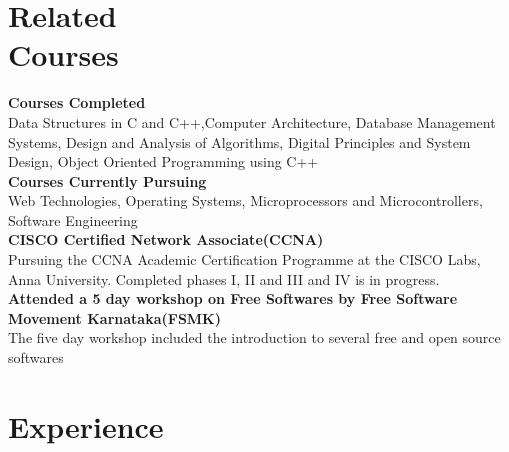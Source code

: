 \documentclass[margin,line]{resume}
\begin{document}
\begin{resume}
    \section{\mysidestyle Related\\Courses} 
    \textbf{Courses Completed}            \vspace{1mm}\\%
    Data Structures in C and C++,Computer Architecture, Database Management Systems, Design and Analysis of Algorithms, Digital Principles and System Design, Object Oriented Programming using C++          \vspace{1mm}\\%
    \textbf{Courses Currently Pursuing}  \vspace{1mm}\\%
    Web Technologies, Operating Systems, Microprocessors and Microcontrollers, Software Engineering    \vspace{1mm}\\%
    \textbf{CISCO Certified Network Associate(CCNA)} \\Pursuing the CCNA Academic Certification Programme at the CISCO Labs, Anna University. Completed phases I, II and III and IV is in progress. \vspace{2mm}\\\vspace{1mm}%
    \textbf{Attended a 5 day workshop on Free Softwares by Free Software Movement Karnataka(FSMK)}\\The five day workshop included the introduction to several free and open source softwares  \vspace{2mm}\vspace{1mm}%

    \section{\mysidestyle Experience}


\end{resume}
\end{document}
